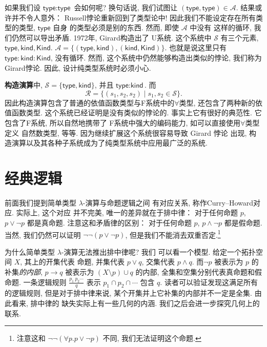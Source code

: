\documentclass[UTF8]{ctexbook}
\newcommand{\cons}[1]{\textsf{#1}}
\theoremstyle{plain}
\theoremstyle{definition}
\theoremstyle{remark}
\begin{document}
如果我们设 \(\cons{type} : \cons{type}\) 会如何呢?
换句话说, 我们试图让 \((\cons{type}, \cons{type}) \in \mathcal A\).
结果或许并不令人意外： Russell悖论重新回到了类型论中!
因此我们不能设定存在所有类型的类型, \(\cons{type}\) 自身
的类型必须是别的东西. 然而, 即使 \(\mathcal A\) 中没有
这样的循环, 我们仍然可以导出矛盾. 1972年, Girard构造出了
U系统.
这个系统中 \(\mathcal S\) 有三个元素,
\(\cons{type}, \cons{kind}, \cons{Kind}\).
\(\mathcal A = \{(\cons{type}, \cons{kind}), (\cons{kind}, \cons{Kind})\}\).
也就是说这里只有 \(\cons{type} : \cons{kind} : \cons{Kind}\),
没有循环. 然而, 这个系统中仍然能够构造出类似的悖论, 我们称为
Girard悖论. 因此, 设计纯类型系统时必须小心.

\textbf{构造演算}中, \(\mathcal S = \{\cons{type}, \cons{kind}\}\),
并且 \(\cons{type} : \cons{kind}\). 而
\[\mathcal R = \{(s_1,s_2,s_2) \mid s_1, s_2 \in \mathcal S\}.\]
因此构造演算包含了普通的依值函数类型与F系统中的\(\forall\)类型,
还包含了两种新的依值函数类型. 这个系统已经证明是没有类似的悖论的.
事实上它有很好的典范性. 它包含了F系统, 所以自然地携带了
F系统中强大的编码能力, 如可以直接使用\(\forall\)类型定义
自然数类型, 等等. 因为继续扩展这个系统很容易导致 Girard 悖论
出现, 构造演算以及其各种子系统成为了纯类型系统中应用最广泛的系统.

\section{经典逻辑}

前面我们提到简单类型 \(\lambda\)-演算与命题逻辑之间
有对应关系, 称作Curry--Howard对应. 实际上, 这个对应
并不完美, 唯一的差异就在于排中律： 对于任何命题 \(p\),
\(p \vee \neg p\) 都是真命题. 注意这和矛盾律的区别：
对于任何命题 \(p\), \(p \wedge \neg p\) 都是假命题.
当然, 我们仍然可以证明 \(\neg \neg (p \vee \neg p)\),
但是我们不能消去双重否定.\footnote{注意这和
\(\neg\neg (\forall p. p \vee \neg p)\) 不同,
我们无法证明这个命题.}

为什么简单类型 \(\lambda\)-演算无法推出排中律呢? 我们
可以看一个模型. 给定一个拓扑空间 \(X\), 其上的开集代表
命题, 并集代表 \(p \vee q\), 交集代表 \(p \wedge q\).
而\(\neg p\) 被表示为 \(p\) 的补集\emph{的内部},
\(p \to q\) 被表示为 \((X \setminus p) \cup q\) 的内部,
全集和空集分别代表真命题和假命题. 一条逻辑规则
\(\frac{p_1~p_2 \cdots}{q}\) 表示 \(p_1 \cap p_2 \cap\cdots\) 包含 \(q\).
读者可以验证发现这满足所有的逻辑规则, 但是对于排中律来说,
某个开集并上它补集的内部并不一定是全集. 由此看来, 排中律的
缺失实际上有一些几何的内涵. 我们之后会进一步探究几何上的
联系.
\end{document}
